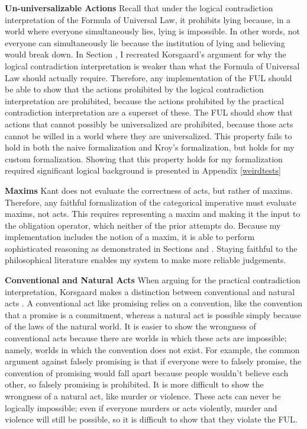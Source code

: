 \begin{isabellebody}
\begin{isamarkuptext}
\noindent \textbf{Un-universalizable Actions} Recall that under 
the logical contradiction interpretation of the Formula of Universal Law, it prohibits lying because, in a world 
where everyone simultaneously lies, lying is impossible. In other words, not everyone can simultaneously
lie because the institution of lying and believing would break down. In Section , 
I recreated Korsgaard's argument for why the logical contradiction interpretation is weaker than what the
Formula of Universal Law should actually require. Therefore, any implementation of the FUL should be 
able to show that the actions prohibited by the logical contradiction interpretation are prohibited, 
because the actions prohibited by the practical contradiction interpretation are a superset of these.
The FUL should show that actions that cannot possibly be universalized are prohibited, because those acts cannot be willed in 
a world where they are universalized. This property fails to hold in both the naive formalization 
and Kroy's formalization, but holds for my custom formalization. Showing that this property holds
for my formalization required significant logical background is presented in Appendix \ref{weirdtests}%
\end{isamarkuptext}\isamarkuptrue%
%
\begin{isamarkuptext}%
\noindent \textbf{Maxims} Kant does not evaluate the correctness of acts, but rather of maxims. Therefore, any 
faithful formalization of the categorical imperative must evaluate maxims, not acts. This requires 
representing a maxim and making it the input to the obligation operator, which neither of the prior 
attempts do. Because my implementation includes the notion of a maxim, it is able to perform sophisticated 
reasoning as demonstrated in Sections  and . Staying faithful to the philosophical 
literature enables my system to make more reliable judgements.

\medskip%
\end{isamarkuptext}\isamarkuptrue%
%
\begin{isamarkuptext}%
\noindent \textbf{Conventional and Natural Acts} When arguing for the practical contradiction interpretation,
Korsgaard makes a distinction between conventional and natural acts \citep{KorsgaardFUL}. 
A conventional act like promising relies on a convention, like the 
convention that a promise is a commitment, whereas a natural act is possible simply because of the laws 
of the natural world. It is easier to show the wrongness of conventional acts because there are worlds 
in which these acts are impossible; namely, worlds in which the convention does not exist. For example, 
the common argument against falsely promising is that if everyone were to falsely promise, the convention 
of promising would fall apart because people wouldn't believe each other, so falsely promising is prohibited. 
It is more difficult to show the wrongness of a natural act, like murder or violence. These acts can 
never be logically impossible; even if everyone murders or acts violently, murder and violence will 
still be possible, so it is difficult to show that they violate the FUL. 


\end{isamarkuptext}
\end{isabellebody}
